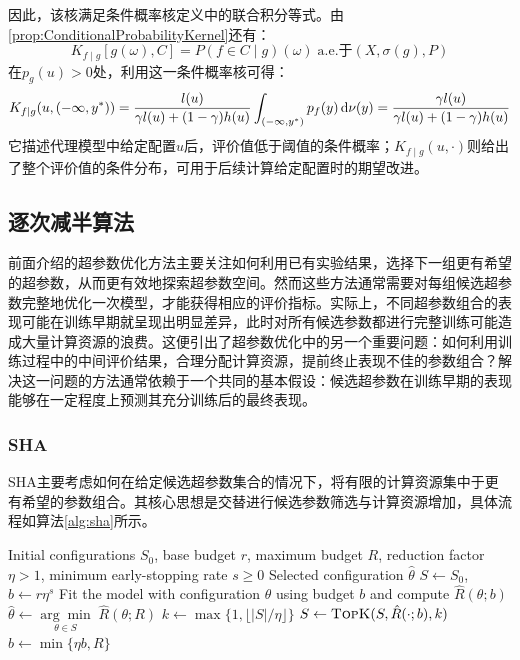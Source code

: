 因此，该核满足条件概率核定义中的联合积分等式。由\cref{prop:ConditionalProbabilityKernel}还有：
\begin{equation*}
	K_{f\mid g}[g(\omega),C]=P(f\in C\mid g)(\omega)
	\;\text{a.e.于$(X,\sigma(g),P)$}
\end{equation*}
在$p_g(u)>0$处，利用这一条件概率核可得：
\begin{equation*}
	K_{f\mid g}(u,(-\infty,y^*))
	=\frac{l(u)}{\gamma l(u)+(1-\gamma)h(u)}\int_{(-\infty,y^*)}p_f(y)\mathop{}\!\mathrm{d}\nu(y)
	=\frac{\gamma l(u)}{\gamma l(u)+(1-\gamma)h(u)}
\end{equation*}
它描述代理模型中给定配置$u$后，评价值低于阈值的条件概率；$K_{f\mid g}(u,\cdot)$则给出了整个评价值的条件分布，可用于后续计算给定配置时的期望改进。

\subsection{逐次减半算法}
前面介绍的超参数优化方法主要关注如何利用已有实验结果，选择下一组更有希望的超参数，从而更有效地探索超参数空间。然而这些方法通常需要对每组候选超参数完整地优化一次模型，才能获得相应的评价指标。实际上，不同超参数组合的表现可能在训练早期就呈现出明显差异，此时对所有候选参数都进行完整训练可能造成大量计算资源的浪费。这便引出了超参数优化中的另一个重要问题：如何利用训练过程中的中间评价结果，合理分配计算资源，提前终止表现不佳的参数组合？解决这一问题的方法通常依赖于一个共同的基本假设：候选超参数在训练早期的表现能够在一定程度上预测其充分训练后的最终表现。
\subsubsection{SHA}
\gls{SHA}主要考虑如何在给定候选超参数集合的情况下，将有限的计算资源集中于更有希望的参数组合。其核心思想是交替进行候选参数筛选与计算资源增加，具体流程如算法\ref{alg:sha}所示。
\begin{algorithm}[H]
	\caption{Successive Halving Algorithm (SHA)}
	\label{alg:sha}
	\begin{algorithmic}[1]
		\Require Initial configurations $S_0$, base budget $r$, maximum budget $R$, reduction factor $\eta>1$, minimum early-stopping rate $s\geqslant0$
		\Ensure Selected configuration $\hat{\theta}$
		\State $S\gets S_0$, $b\gets r\eta^s$ 
		\State Fit the model with configuration $\theta$ using budget $b$ and compute $\hat{R}(\theta;b)$
		\EndFor
		\State \Return $\hat{\theta}\gets\underset{\theta\in S}{\arg\min}\;\hat{R}(\theta;R)$
		\EndIf
		\State $k\gets\max\{1,\lfloor|S|/\eta\rfloor\}$
		\State $S\gets\Call{TopK}{S,\hat{R}(\cdot;b),k}$
		\State $b\gets\min\{\eta b,R\}$
		\EndWhile
	\end{algorithmic}
\end{algorithm}
